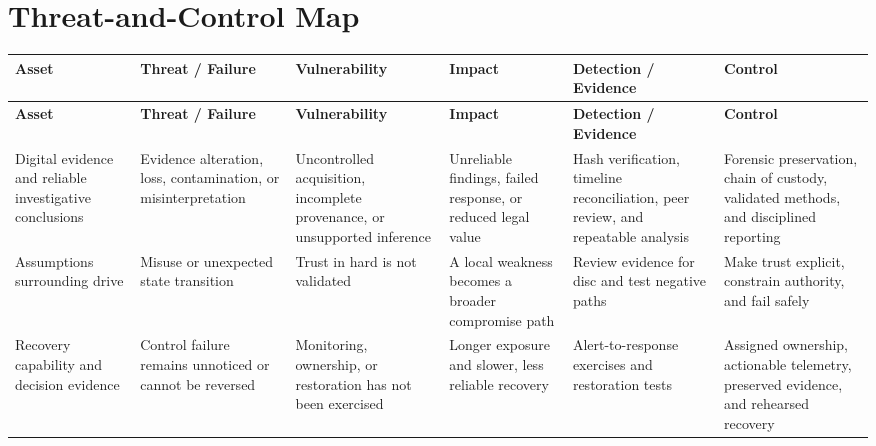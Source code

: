 \documentclass[11pt]{article}
\begin{document}
\section*{Threat-and-Control Map}
\begingroup\scriptsize\setlength{\tabcolsep}{2pt}
\begin{longtable}{>{\RaggedRight\arraybackslash}p{}>{\RaggedRight\arraybackslash}p{}>{\RaggedRight\arraybackslash}p{}>{\RaggedRight\arraybackslash}p{}>{\RaggedRight\arraybackslash}p{}>{\RaggedRight\arraybackslash}p{}}
\toprule\rowcolor{Navy}\color{white}\textbf{Asset} & \color{white}\textbf{Threat / Failure} & \color{white}\textbf{Vulnerability} & \color{white}\textbf{Impact} & \color{white}\textbf{Detection / Evidence} & \color{white}\textbf{Control}\\\midrule
\endfirsthead
\toprule\rowcolor{Navy}\color{white}\textbf{Asset} & \color{white}\textbf{Threat / Failure} & \color{white}\textbf{Vulnerability} & \color{white}\textbf{Impact} & \color{white}\textbf{Detection / Evidence} & \color{white}\textbf{Control}\\\midrule
\endhead
Digital evidence and reliable investigative conclusions & Evidence alteration, loss, contamination, or misinterpretation & Uncontrolled acquisition, incomplete provenance, or unsupported inference & Unreliable findings, failed response, or reduced legal value & Hash verification, timeline reconciliation, peer review, and repeatable analysis & Forensic preservation, chain of custody, validated methods, and disciplined reporting\\\midrule
Assumptions surrounding drive & Misuse or unexpected state transition & Trust in hard is not validated & A local weakness becomes a broader compromise path & Review evidence for disc and test negative paths & Make trust explicit, constrain authority, and fail safely\\\midrule
Recovery capability and decision evidence & Control failure remains unnoticed or cannot be reversed & Monitoring, ownership, or restoration has not been exercised & Longer exposure and slower, less reliable recovery & Alert-to-response exercises and restoration tests & Assigned ownership, actionable telemetry, preserved evidence, and rehearsed recovery\\\midrule
\bottomrule
\end{longtable}
\endgroup
\end{document}
